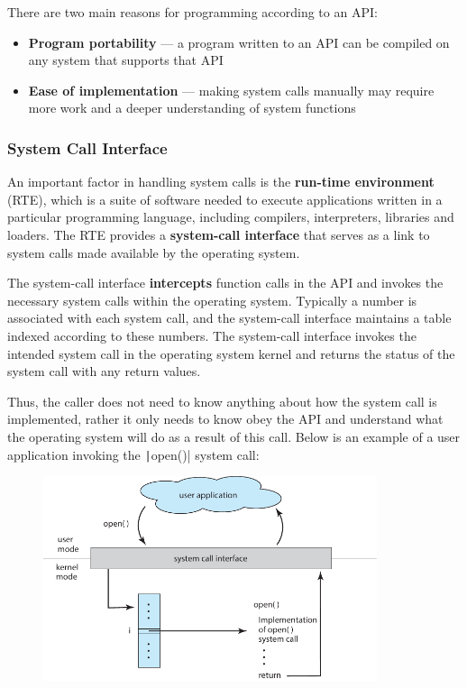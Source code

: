 \documentclass{article}
\begin{document}
There are two main reasons for programming according to an API:
\begin{itemize}
    \item \textbf{Program portability} --- a program written to an API
          can be compiled on any system that supports that API
    \item \textbf{Ease of implementation} --- making system
          calls manually may require more work and a deeper
          understanding of system functions
\end{itemize}
\subsubsection{System Call Interface}
An important factor in handling system calls is the \textbf{run-time
environment} (RTE), which is a suite of software needed to execute
applications written in a particular programming language, including
compilers, interpreters, libraries and loaders. The RTE provides a
\textbf{system-call interface} that serves as a link to system calls
made available by the operating system.

The system-call interface \textbf{intercepts} function calls in the API
and invokes the necessary system calls within the operating system.
Typically a number is associated with each system call, and the
system-call interface maintains a table indexed according to these
numbers. The system-call interface invokes the intended system call in
the operating system kernel and returns the status of the system call
with any return values.

Thus, the caller does not need to know anything about how the system
call is implemented, rather it only needs to know obey the API and
understand what the operating system will do as a result of this call.
Below is an example of a user application invoking the
\texttt|open()| system call:
\begin{figure}[H] \centering
    \includegraphics[height = 6cm]{figures/system_call_open.pdf}
\end{figure}
\end{document}
